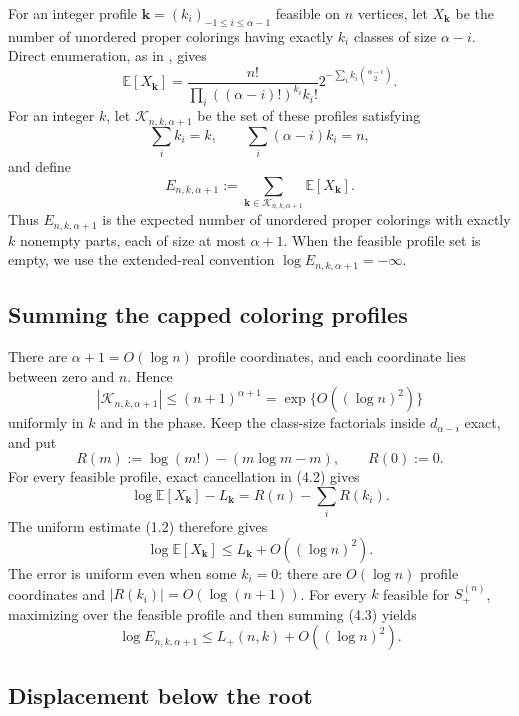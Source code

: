 \documentclass[a4paper,10pt,reqno]{amsart}
\numberwithin{equation}{section}
\newcommand{\Exp}[1]{\mathbb{E}\!\left[#1\right]}
\theoremstyle{plain}
\theoremstyle{remark}
\begin{document}
For an integer profile
$\mathbf k=(k_i)_{-1\le i\le\alpha-1}$ feasible on $n$ vertices, let
$X_{\mathbf k}$ be the number of unordered proper colorings having exactly
$k_i$ classes of size $\alpha-i$. Direct enumeration, as in
\citet[Section~2.3]{heckel-2025-difference}, gives
\begin{equation*}
  \Exp{X_{\mathbf k}}
  =\frac{n!}{\prod_i((\alpha-i)!)^{k_i}k_i!}
   2^{-\sum_i k_i\binom{\alpha-i}{2}}.
  \tag{4.2}
\end{equation*}
For an integer $k$, let $\mathcal K_{n,k,\alpha+1}$ be the set of these
profiles satisfying
\[
  \sum_i k_i=k,
  \qquad
  \sum_i(\alpha-i)k_i=n,
\]
and define
\[
  E_{n,k,\alpha+1}
  :=\sum_{\mathbf k\in\mathcal K_{n,k,\alpha+1}}
    \Exp{X_{\mathbf k}}.
\]
Thus $E_{n,k,\alpha+1}$ is the expected number of unordered proper colorings
with exactly $k$ nonempty parts, each of size at most $\alpha+1$.
When the feasible profile set is empty, we use the extended-real convention
$\log E_{n,k,\alpha+1}=-\infty$.

\subsection*{Summing the capped coloring profiles}

There are $\alpha+1=O(\log n)$ profile coordinates, and each coordinate lies
between zero and $n$. Hence
\begin{equation*}
  |\mathcal K_{n,k,\alpha+1}|
  \le(n+1)^{\alpha+1}
  =\exp\{O((\log n)^2)\}
  \tag{4.3}
\end{equation*}
uniformly in $k$ and in the phase. Keep the class-size factorials inside
$d_{\alpha-i}$ exact, and put
\[
  R(m):=\log(m!)-(m\log m-m),\qquad R(0):=0.
\]
For every feasible profile, exact cancellation in (4.2) gives
\[
  \log\Exp{X_{\mathbf k}}-L_{\mathbf k}
  =R(n)-\sum_iR(k_i).
\]
The uniform estimate (1.2) therefore gives
\[
  \log\Exp{X_{\mathbf k}}
  \le L_{\mathbf k}+O((\log n)^2).
\]
The error is uniform even when some $k_i=0$: there are $O(\!\log n)$ profile
coordinates and $|R(k_i)|=O(\!\log(n+1))$. For every $k$ feasible for
$S_+^{(n)}$, maximizing over the feasible profile and then summing (4.3) yields
\begin{equation*}
  \log E_{n,k,\alpha+1}
  \le L_+(n,k)+O((\log n)^2).
  \tag{4.3a}
\end{equation*}

\subsection*{Displacement below the root}
\end{document}
